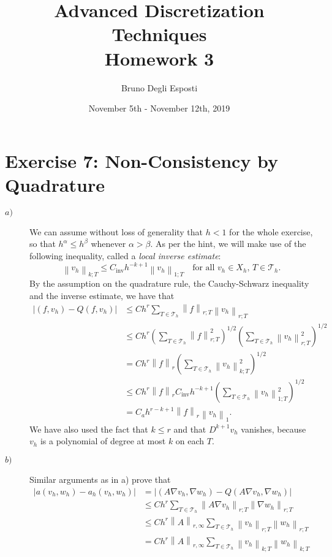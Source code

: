 \documentclass[a4paper]{article}
\title{\huge{Advanced Discretization Techniques \\ Homework 3}}
\author{\Large{Bruno Degli Esposti}}
\date{November 5th - November 12th, 2019}
\newcommand{\abs}[1]{\left\lvert#1\right\rvert}
\newcommand{\norm}[1]{\left\lVert#1\right\rVert}
\begin{document}
\maketitle

\section*{Exercise 7: Non-Consistency by Quadrature}
\begin{description}
\item[$a)$] We can assume without loss of generality that $h < 1$ for the whole exercise,
	so that $h^\alpha \leq h^\beta$ whenever $\alpha > \beta$. As per the hint,
	we will make use of the following inequality, called a \emph{local inverse estimate}:
	\[
	\norm{v_h}_{k;T} \leq C_\text{inv} h^{-k+1} \norm{v_h}_{1;T}
	\quad \text{for all } v_h \in X_h, \, T \in \mathcal{T}_h.
	\]
	By the assumption on the quadrature rule, the Cauchy-Schwarz inequality
	and the inverse estimate, we have that
	\begin{align*}
	\abs{(f,v_h) - Q(f,v_h)}
&	\leq C h^r \sum_{T \in \mathcal{T}_h} \norm{f}_{r;T} \norm{v_h}_{r;T} \\
&	\leq C h^r \left( \sum_{T \in \mathcal{T}_h} \norm{f}_{r;T}^2   \right)^{1/2}
	           \left( \sum_{T \in \mathcal{T}_h} \norm{v_h}_{r;T}^2 \right)^{1/2} \\
&	= C h^r \norm{f}_r \left( \sum_{T \in \mathcal{T}_h} \norm{v_h}_{k;T}^2 \right)^{1/2} \\
&	\leq C h^r \norm{f}_r C_\text{inv} h^{-k+1}
	           \left( \sum_{T \in \mathcal{T}_h} \norm{v_h}_{1;T}^2 \right)^{1/2} \\
&	= C_a h^{r-k+1} \norm{f}_r \norm{v_h}_1.
	\end{align*}
	We have also used the fact that $k \leq r$ and that $D^{k+1}v_h$ vanishes,
	because $v_h$ is a polynomial of degree at most $k$ on each $T$.
\item[$b)$] Similar arguments as in a) prove that
	\begin{align*}
	\abs{a(v_h,w_h) - a_h(v_h,w_h)}
&	= \abs{(A \nabla v_h, \nabla w_h) - Q(A \nabla v_h, \nabla w_h)} \\
&	\leq C h^r \sum_{T \in \mathcal{T}_h} \norm{A \nabla v_h}_{r;T} \norm{\nabla w_h}_{r;T} \\
&	\leq C h^r \norm{A}_{r,\infty}
		\sum_{T \in \mathcal{T}_h} \norm{v_h}_{r;T} \norm{w_h}_{r;T} \\
&	= C h^r \norm{A}_{r,\infty}
		\sum_{T \in \mathcal{T}_h} \norm{v_h}_{k;T} \norm{w_h}_{k;T} \\

\end{align*}
\end{description}
\end{document}
